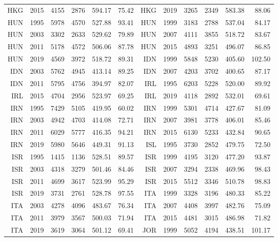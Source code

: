 {\begin{longtable}{r|r|r|r|r|r||r|r|r|r|r|r}
    HKG   & 2015  & 4155  & 2876  & 594.17 & 75.42  & HKG   & 2019  & 3265  & 2349  & 583.38 & 88.06 \\
    HUN   & 1995  & 5978  & 4570  & 527.88 & 93.41  & HUN   & 1999  & 3183  & 2788  & 537.04 & 84.17 \\
    HUN   & 2003  & 3302  & 2633  & 529.62 & 79.89  & HUN   & 2007  & 4111  & 3855  & 518.72 & 83.67 \\
    HUN   & 2011  & 5178  & 4572  & 506.06 & 87.78  & HUN   & 2015  & 4893  & 3251  & 496.07 & 86.85 \\
    HUN   & 2019  & 4569  & 3972  & 518.72 & 89.31  & IDN   & 1999  & 5848  & 5230  & 405.60 & 102.50 \\
    IDN   & 2003  & 5762  & 4945  & 413.14 & 89.25  & IDN   & 2007  & 4203  & 3702  & 400.65 & 87.17 \\
    IDN   & 2011  & 5795  & 4756  & 394.97 & 82.07  & IRL   & 1995  & 6203  & 5228  & 520.00 & 89.92 \\
    IRL   & 2015  & 4704  & 2956  & 523.97 & 69.25  & IRL   & 2019  & 4118  & 2892  & 532.01 & 69.61 \\
    IRN   & 1995  & 7429  & 5105  & 419.95 & 60.02  & IRN   & 1999  & 5301  & 4714  & 427.67 & 81.09 \\
    IRN   & 2003  & 4942  & 4703  & 414.08 & 72.71  & IRN   & 2007  & 3981  & 3778  & 406.01 & 85.46 \\
    IRN   & 2011  & 6029  & 5777  & 416.35 & 94.21  & IRN   & 2015  & 6130  & 5233  & 432.84 & 90.65 \\
    IRN   & 2019  & 5980  & 5646  & 449.31 & 91.13  & ISL   & 1995  & 3730  & 2852  & 479.75 & 72.50 \\
    ISR   & 1995  & 1415  & 1136  & 528.51 & 89.57  & ISR   & 1999  & 4195  & 3120  & 477.20 & 93.87 \\
    ISR   & 2003  & 4318  & 3279  & 501.46 & 84.46  & ISR   & 2007  & 3294  & 2338  & 469.96 & 98.43 \\
    ISR   & 2011  & 4699  & 3617  & 523.99 & 95.29  & ISR   & 2015  & 5512  & 3346  & 510.78 & 98.83 \\
    ISR   & 2019  & 3731  & 2761  & 528.78 & 97.55  & ITA   & 1999  & 3328  & 3196  & 480.33 & 85.22 \\
    ITA   & 2003  & 4278  & 4096  & 483.67 & 76.34  & ITA   & 2007  & 4408  & 3997  & 482.76 & 75.09 \\
    ITA   & 2011  & 3979  & 3567  & 500.03 & 71.94  & ITA   & 2015  & 4481  & 3015  & 486.98 & 71.82 \\
    ITA   & 2019  & 3619  & 3064  & 501.12 & 69.41  & JOR   & 1999  & 5052  & 4194  & 438.51 & 101.17 \\

\end{longtable}}
